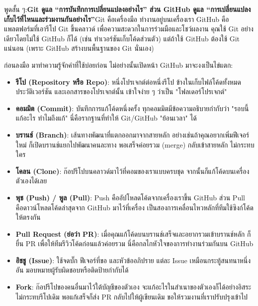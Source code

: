พูดสั้น ๆ:\textbf{Git ดูแล “การบันทึกการเปลี่ยนแปลงอย่างไร” ส่วน GitHub ดูแล “การเปลี่ยนแปลงเก็บไว้ที่ไหนและร่วมงานกันอย่างไร”}Git คือเครื่องมือ ทำงานอยู่บนเครื่องเรา GitHub คือแพลตฟอร์มที่เอารีโป Git ขึ้นคลาวด์ เพื่อความสะดวกในการร่วมมือและโชว์ผลงาน คุณใช้ Git อย่างเดียวโดยไม่ใช้ GitHub ก็ได้ (เช่น ทำเวอร์ชันเก็บโค้ดส่วนตัว) แต่ถ้าใช้ GitHub ต้องใช้ Git แน่นอน (เพราะ GitHub สร้างบนพื้นฐานของ Git นั่นเอง)



ก่อนลงมือ มาทำความรู้จักคำที่ใช้บ่อยก่อน ไม่อย่างนั้นเปิดหน้า GitHub มาจะงงเป็นไข่แตก:

\begin{itemize}
  \item \textbf{รีโป (Repository หรือ Repo)}: หนึ่งโปรเจกต์ต่อหนึ่งรีโป ข้างในเก็บไฟล์โค้ดทั้งหมด ประวัติเวอร์ชัน และเอกสารของโปรเจกต์นั้น เข้าใจง่าย ๆ ว่าเป็น "โฟลเดอร์โปรเจกต์"
  \item \textbf{คอมมิต (Commit)}: บันทึกการแก้โค้ดหนึ่งครั้ง ทุกคอมมิตมีข้อความอธิบายกำกับว่า "รอบนี้แก้อะไร ทำไมถึงแก้" นี่คือรากฐานที่ทำให้ Git/GitHub "ย้อนเวลา" ได้
  \item \textbf{บรานช์ (Branch)}: เส้นทางพัฒนาที่แตกออกมาจากสายหลัก อย่างเช่นถ้าคุณอยากเพิ่มฟีเจอร์ใหม่ ก็เปิดบรานช์แยกไปพัฒนาคนละทาง พอเสร็จค่อยรวม (merge) กลับเข้าสายหลัก ไม่กระทบใคร
  \item \textbf{โคลน (Clone)}: ก๊อปรีโปบนคลาวด์มาไว้ที่คอมของเราแบบครบชุด จากนั้นก็แก้โค้ดบนเครื่องตัวเองได้เลย
  \item \textbf{พุช (Push) / พูล (Pull)}: Push คืออัปโหลดโค้ดจากเครื่องเราขึ้น GitHub ส่วน Pull คือดาวน์โหลดโค้ดล่าสุดจาก GitHub มาไว้ที่เครื่อง เป็นสองการเคลื่อนไหวหลักที่ทีมใช้ซิงก์โค้ดให้ตรงกัน
  \item \textbf{Pull Request (ย่อว่า PR)}: เมื่อคุณแก้โค้ดบนบรานช์เสร็จและอยากรวมเข้าบรานช์หลัก ก็ยื่น PR เพื่อให้ทีมรีวิวโค้ดก่อนแล้วค่อยรวม นี่คือกลไกหัวใจของการทำงานร่วมกันบน GitHub
  \item \textbf{อิชชู (Issue)}: ใช้จดบั๊ก ฟีเจอร์ที่ขอ และหัวข้ออภิปราย แต่ละ Issue เหมือนกระทู้สนทนาหนึ่งอัน มอบหมายผู้รับผิดชอบหรือติดป้ายกำกับได้
  \item \textbf{Fork}: ก๊อปรีโปของคนอื่นมาไว้ใต้บัญชีของตัวเอง จะแก้อะไรในสำเนาของตัวเองก็ได้อย่างอิสระ ไม่กระทบรีโปเดิม พอแก้เสร็จก็ส่ง PR กลับไปให้ผู้เขียนเดิม ขอให้รวมงานที่เราปรับปรุงเข้าไป
\end{itemize}


